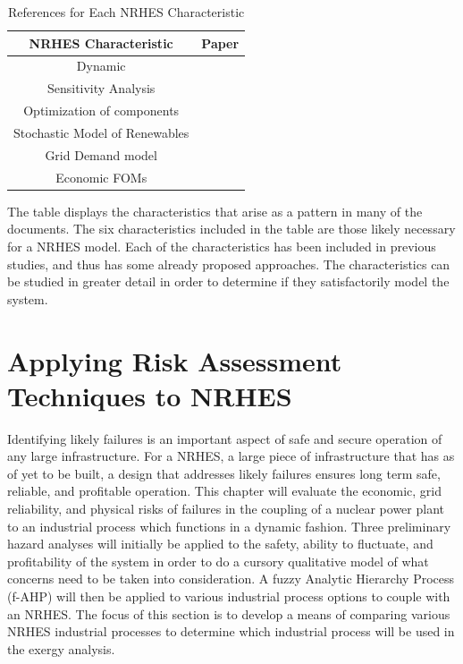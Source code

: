 \documentclass[12pt]{UIdahoMastersThesis}
\begin{document}
\begin{table}[h!]
\centering
\caption{References for Each NRHES Characteristic}
\begin{tabular}{ ||c | c|| }
 \hline 
 NRHES Characteristic & Paper \\ [0.5ex]
 \hline \hline
 Dynamic & \cite{Garcia2013, Du2014, Kazimi, Garcia2016}\\
 \hline
 Sensitivity Analysis & \cite{Shropshire2011, Rehman2010, Adaramola2014, Chen2016}\\
 \hline
 Optimization of components & \cite{Chen2016,Ozcan2016, Forsberg2009,Garcia2015,Aumeier2011}\\
 \hline
 Stochastic Model of Renewables & \cite{Rabiti2015, Garcia2016,Locatelli2015}\\ 
 \hline
 Grid Demand model & \cite{Forsberg2013, Garcia2016,Garcia2013,Ruth2014,Chen2016}\\
 \hline
  Economic FOMs & \cite{Garcia2016,Chen2016,Rabiti2015,Epiney2016,Bragg-Sitton2014}\\
 \hline
\end{tabular}
\label{table:1}
\end{table}

The table displays the characteristics that arise as a pattern in many of the documents.  The six characteristics included in the table are those likely necessary for a NRHES model.  Each of the characteristics has been included in previous studies, and thus has some already proposed approaches.  The characteristics can be studied in greater detail in order to determine if they satisfactorily model the system.


\chapter{Applying Risk Assessment Techniques to NRHES}
\label{AHPChapter}
Identifying likely failures is an important aspect of safe and secure operation of any large infrastructure. For a NRHES, a large piece of infrastructure that has as of yet to be built, a design that addresses likely failures ensures long term safe, reliable, and profitable operation. This chapter will evaluate the economic, grid reliability, and physical risks of failures in the coupling of a nuclear power plant to an industrial process which functions in a dynamic fashion. Three preliminary hazard analyses will initially be applied to the safety, ability to fluctuate, and profitability of the system in order to do a cursory qualitative model of what concerns need to be taken into consideration. A fuzzy Analytic Hierarchy Process (f-AHP) will then be applied to various industrial process options to couple with an NRHES. The focus of this section is to develop a means of comparing various NRHES industrial processes to determine which industrial process will be used in the exergy analysis. 
\end{document}
